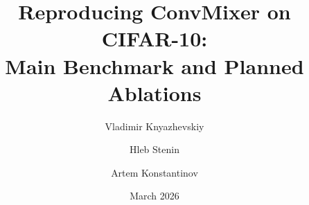 \documentclass[10pt,twocolumn]{article}
\title{Reproducing ConvMixer on CIFAR-10:\\Main Benchmark and Planned Ablations}
\author{Vladimir Knyazhevskiy \and Hleb Stenin \and Artem Konstantinov}
\date{March 2026}
\begin{document}
\maketitle

\begin{abstract}

\end{abstract}










\end{document}
